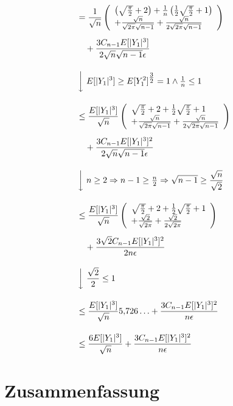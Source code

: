 \begin{align*}
\begin{array}{l}
\end{array}  \\[1em]
&= \frac{1}{\sqrt n} \left(\begin{array}{l}\left(\sqrt{\frac\pi2}+2\right)+\frac 1n\left(\frac 12 \sqrt{\frac \pi2}+1\right)\\ +\frac{\sqrt{n}}{\sqrt{2\pi}\sqrt{n-1}} + \frac{\sqrt{n}}{2\sqrt{2\pi}\sqrt{n-1}}\end{array}\right) \\[0.5em]
&\quad + \frac{3C_{n-1}E[|Y_1|^3]}{2\sqrt{n}\sqrt{n-1}\epsilon} \\[1em]
&\left\downarrow\ E[|Y_1|^3] \ge E[Y_1^2]^{\tfrac 32}=1 \land \tfrac 1n \le 1\right.\\[1em]
&\le \frac{E[|Y_1|^3]}{\sqrt n} \left(\begin{array}{l}\sqrt{\frac\pi2}+2+\frac 12 \sqrt{\frac \pi2}+1\\ +\frac{\sqrt{n}}{\sqrt{2\pi}\sqrt{n-1}} + \frac{\sqrt{n}}{2\sqrt{2\pi}\sqrt{n-1}}\end{array}\right) \\[0.5em]
&\quad + \frac{3C_{n-1}E[|Y_1|^3]^2}{2\sqrt{n}\sqrt{n-1}\epsilon} \\[1em]
&\left\downarrow\ n \ge 2 \Rightarrow n-1 \ge \tfrac n2 \Rightarrow \sqrt{n-1} \ge \frac{\sqrt{n}}{\sqrt 2} \right. \\[1em]
&\le \frac{E[|Y_1|^3]}{\sqrt n} \left(\begin{array}{l}\sqrt{\frac\pi2}+2+\frac 12 \sqrt{\frac \pi2}+1\\ +\frac{\sqrt{2}}{\sqrt{2\pi}} + \frac{\sqrt{2}}{2\sqrt{2\pi}}\end{array}\right) \\[0.5em]
&\quad + \frac{3\sqrt{2}C_{n-1}E[|Y_1|^3]^2}{2n\epsilon}\\[1em]
&\left\downarrow\ \frac{\sqrt 2}2 \le 1 \right. \\[1em]
&\le \frac{E[|Y_1|^3]}{\sqrt n} 5{,}726\ldots + \frac{3 C_{n-1}E[|Y_1|^3]^2}{n\epsilon} \\[1em]
&\le \frac{6E[|Y_1|^3]}{\sqrt n} + \frac{3 C_{n-1}E[|Y_1|^3]^2}{n\epsilon}
\end{align*}

\section{Zusammenfassung}


